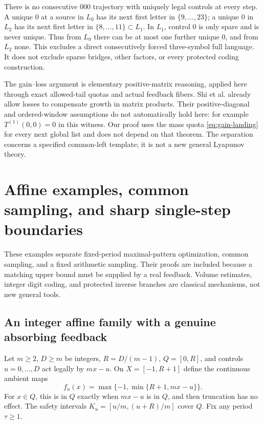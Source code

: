 \documentclass[11pt,reqno]{amsart}
\numberwithin{equation}{section}
\theoremstyle{definition}
\begin{document}
There is no consecutive $000$ trajectory with uniquely legal
controls at every step. A unique $0$ at a source in $L_0$ has its
next first letter in $\{9,\ldots,23\}$; a unique $0$ in $L_2$
has its next first letter in $\{8,\ldots,11\}\subset L_1$.
In $L_1$, control $0$ is only spare and is never unique.
Thus from $L_0$ there can be at most one further unique $0$,
and from $L_2$ none. This excludes a direct consecutively forced
three-symbol full language. It does not exclude sparse bridges,
other factors, or every protected coding construction.

The gain--loss argument is elementary positive-matrix reasoning,
applied here through exact allowed-tail quotas and actual feedback
fibers. Shi et al. \cite[Definition~2.5 and Theorems~2.6, 2.8,
pp.~8--11 of arXiv:2004.01867v2]{Shi2021}
already allow losses to compensate growth in matrix products.
Their positive-diagonal and ordered-window assumptions do not
automatically hold here: for example $T^{(1)}(0,0)=0$ in this
witness. Our proof uses the mass quota
\eqref{eq:gain-landing} for every next global list and does not
depend on that theorem. The separation concerns a specified
common-left template; it is not a new general Lyapunov theory.

\section{Affine examples, common sampling, and sharp single-step boundaries}
\label{sec:affine}

These examples separate fixed-period maximal-pattern optimization,
common sampling, and a fixed arithmetic sampling. Their proofs are
included because a matching upper bound must be supplied by a real
feedback. Volume estimates, integer digit coding, and protected inverse
branches are classical mechanisms, not new general tools.

\subsection{An integer affine family with a genuine absorbing feedback}
Let $m\ge2$, $D\ge m$ be integers, $R=D/(m-1)$,
$Q=[0,R]$, and controls $u=0,\ldots,D$ act legally by $mx-u$.
On $X=[-1,R+1]$ define the continuous ambient maps
\[
 f_u(x)=\max\{-1,\min\{R+1,mx-u\}\}.
\]
For $x\in Q$, this is in $Q$ exactly when $mx-u$ is in $Q$,
and then truncation has no effect. The safety intervals
$K_u=[u/m,(u+R)/m]$ cover $Q$. Fix any period $\tau\ge1$.
\end{document}
